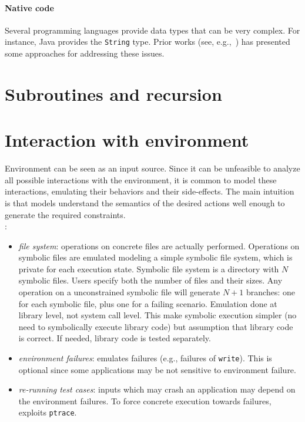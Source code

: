 \paragraph{Native code} Several programming languages provide data types that can be very complex. For instance, Java provides the {\tt String} type. Prior works (see, e.g.,~\cite{SHZ-TAIC07}) has presented some approaches for addressing these issues.


\section{Subroutines and recursion}
\label{se:recursion}


\section{Interaction with environment}

Environment can be seen as an input source. Since it can be unfeasible to analyze all possible interactions with the environment, it is common to model these interactions, emulating their behaviors and their side-effects. The main intuition is that models understand the semantics of the desired actions well enough to generate the required constraints.\\

\cite{KLEE-OSDI08}:
\begin{itemize}
  \item {\em file system}: operations on concrete files are actually performed. Operations on symbolic files are emulated modeling a simple symbolic file system, which is private for each execution state. Symbolic file system is a directory with $N$ symbolic files. Users specify both the number of files and their sizes. Any operation on a unconstrained symbolic file will generate $N+1$ branches: one for each symbolic file, plus one for a failing scenario. Emulation done at library level, not system call level. This make symbolic execution simpler (no need to symbolically execute library code) but assumption that library code is correct. If needed, library code is tested separately.
  \item {\em environment failures}: \cite{KLEE-OSDI08} emulates failures (e.g., failures of {\tt write}). This is optional since some applications may be not sensitive to environment failure.
  \item {\em re-running test cases}: inputs which may crash an application may depend on the environment failures. To force concrete execution towards failures, \cite{KLEE-OSDI08} exploits {\tt ptrace}.
\end{itemize}

